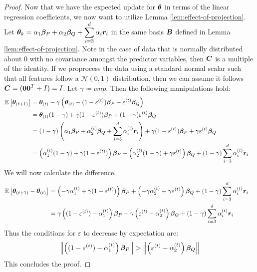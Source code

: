 \documentclass{article} %
\newcommand{\norm}[1]{\left\lVert#1\right\rVert}
\begin{document}
\begin{appendices}
\begin{proof}
		\endgroup
		Now that we have the expected update for ${\bm{\theta}}$ in terms of the linear regression coefficients, we now want to utilize Lemma \ref{lem:effect-of-projection}.\\
		Let $\displaystyle {\bm{\theta}}_k = \alpha_1{\bm{\beta}}_P + \alpha_2{\bm{\beta}}_Q + \sum_{i=3}^{d}\alpha_i {\bm{r}}_i$ in the same basis ${\bm{B}}$ defined in Lemma \ref{lem:effect-of-projection}. Note in the case of data that is normally distributed about $0$ with no covariance amongst the predictor variables, then ${\bm{C}}$ is a multiple of the identity. If we proprocess the data using a standard normal scalar such that all features follow a $\mathcal{N}(0,1)$ distribution, then we can assume it follows $\displaystyle {\bm{C}} = ({\bm{0}}{\bm{0}}^T + I) = I$. Let $\gamma \coloneqq \alpha np$. Then the following manipulations hold:
		\begin{align*}
			\mathbb{E}\left[{\bm{\theta}}_{(t+1)}\right] &= {\bm{\theta}}_{(t)} - \gamma\left({\bm{\theta}}_{(t)} - (1-\varepsilon^{(t)}){\bm{\beta}}_P - \varepsilon^{(t)} {\bm{\beta}}_Q\right) &&\\
			&= {\bm{\theta}}_{(t)}(1-\gamma) + \gamma (1-\varepsilon^{(t)}){\bm{\beta}}_P + (1-\gamma)\varepsilon^{(t)}{\bm{\beta}}_Q &&\\
			&= (1-\gamma)\left(\alpha_1 {\bm{\beta}}_P + \alpha_2^{(t)} {\bm{\beta}}_Q + \sum_{i=3}^d\alpha_i^{(t)}{\bm{r}}_i\right) + \gamma(1-\varepsilon^{(t)}){\bm{\beta}}_P + \gamma\varepsilon^{(t)}{\bm{\beta}}_Q &&\\
			&= \left(\alpha_1^{(t)}(1-\gamma) + \gamma(1-\varepsilon^{(t)})\right){\bm{\beta}}_P + \left(\alpha_2^{(t)}(1-\gamma) + \gamma \varepsilon^{(t)}\right){\bm{\beta}}_Q + (1-\gamma)\sum_{i=3}^d\alpha_i^{(t)}{\bm{r}}_i &&
		\end{align*}
		We will now calculate the difference. 
		\begin{align*}
			\mathbb{E}\left[{\bm{\theta}}_{(t+1)} - {\bm{\theta}}_{(t)}\right] &= \left(-\gamma\alpha_1^{(t)} + \gamma(1-\varepsilon^{(t)})\right){\bm{\beta}}_P + \left(-\gamma \alpha_2^{(t)} + \gamma \varepsilon^{(t)}\right){\bm{\beta}}_Q + (1-\gamma)\sum_{i=3}^d\alpha_i^{(t)}{\bm{r}}_i &&\\
			&= \gamma\left((1-\varepsilon^{(t)}) - \alpha_1^{(t)}\right){\bm{\beta}}_P + \gamma\left(\varepsilon^{(t)} - \alpha_2^{(t)}\right){\bm{\beta}}_Q + (1-\gamma)\sum_{i=3}^d\alpha_i^{(t)}{\bm{r}}_i &&
		\end{align*}
		Thus the conditions for $\varepsilon$ to decrease by expectation are:
		\begin{equation}
			\norm{\left((1-\varepsilon^{(t)}) - \alpha_1^{(t)}\right)\vbeta_P} > \norm{\left(\varepsilon^{(t)} - \alpha_2^{(t)}\right)\vbeta_Q}
		\end{equation}  
		This concludes the proof. 
	\end{proof}


\end{appendices}
\end{document}
